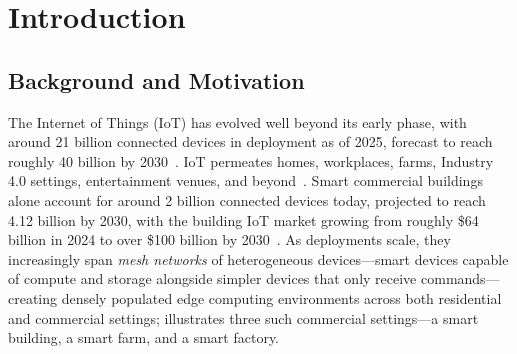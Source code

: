 \section{Introduction}
\label{sec:intro}

\subsection{Background and Motivation}
\label{intro:sec:background}

The Internet of Things (IoT) has evolved well beyond its early phase, with around 21 billion connected devices in deployment as of 2025, forecast to reach roughly 40 billion by 2030~\cite{iotanalytics2025}. IoT permeates homes, workplaces, farms, Industry 4.0 settings, entertainment venues, and beyond~\cite{IoTfuture, farmbeats, lampropoulos2019internet}. Smart commercial buildings alone account for around 2 billion connected devices today, projected to reach 4.12 billion by 2030, with the building IoT market growing from roughly \$64 billion in 2024 to over \$100 billion by 2030~\cite{memoori2025iot}. As deployments scale, they increasingly span \emph{mesh networks} of heterogeneous devices---smart devices capable of compute and storage alongside simpler devices that only receive commands---creating densely populated edge computing environments across both residential and commercial settings;  illustrates three such commercial settings---a smart building, a smart farm, and a smart factory.

